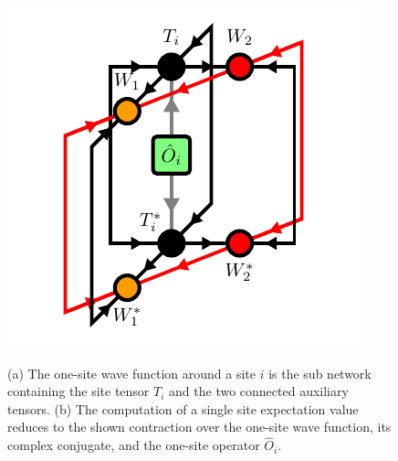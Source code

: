 \begin{figure}
	\centering
	\subcaptionbox{\label{fig:YB_isoTPS_onesite_expectation_value_environment}}
	{%
		\usebox{\largestimage}
	}
	\quad\quad
	\subcaptionbox{\label{fig:YB_isoTPS_onesite_expectation_value_computation}}
	{%
		\raisebox{\dimexpr.5\ht\largestimagea-.5\height}
		{%
			\includegraphics[scale=1.0]{figures/tikz/YB_isoTPS/one_site_expectation_value/one_site_expectation_value_b.pdf}
		}
	}
	\caption{(a) The one-site wave function around a site $i$ is the sub network containing the site tensor $T_i$ and the two connected auxiliary tensors. (b) The computation of a single site expectation value reduces to the shown contraction over the one-site wave function, its complex conjugate, and the one-site operator $\hat{O}_i$.}
	\label{fig:YB_isoTPS_onesite_expectation_value}
\end{figure}
